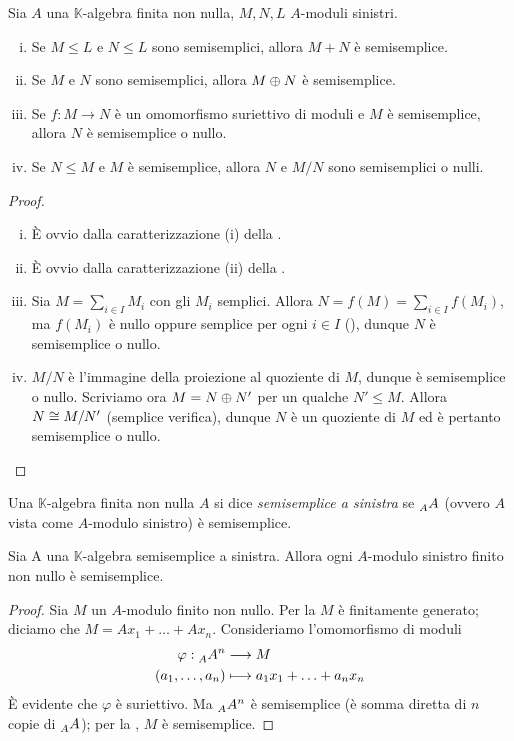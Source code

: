\begin{proposition}
Sia $A$ una $\mathbb{K}$-algebra finita non nulla, $M,N,L$ $A$-moduli sinistri.
\begin{enumerate}[(i)]
\item Se $M\le L$ e $N\le L$ sono semisemplici, allora $M+N$ è semisemplice.
\item Se $M$ e $N$ sono semisemplici, allora $M\oplus N$ è semisemplice.
\item Se $f:M\to N$ è un omomorfismo suriettivo di moduli e $M$ è semisemplice, allora $N$ è semisemplice o nullo.
\item Se $N\le M$ e $M$ è semisemplice, allora $N$ e $M/N$ sono semisemplici o nulli.
\end{enumerate}
\end{proposition}
\begin{proof}
\leavevmode
\begin{enumerate}[(i)]
\item È ovvio dalla caratterizzazione (i) della .
\item È ovvio dalla caratterizzazione (ii) della .
\item Sia $M=\sum_{i\in I}M_i$ con gli $M_i$ semplici. Allora $N=f(M)=\sum_{i\in I}f(M_i)$, ma $f(M_i)$ è nullo oppure semplice per ogni $i\in I$ (), dunque $N$ è semisemplice o nullo.
\item $M/N$ è l'immagine della proiezione al quoziente di $M$, dunque è semisemplice o nullo. Scriviamo ora $M=N\oplus N'$ per un qualche $N'\le M$. Allora $N\cong M/N'$ (semplice verifica), dunque $N$ è un quoziente di $M$ ed è pertanto semisemplice o nullo.
\end{enumerate}
\end{proof}


\begin{definition}
Una $\mathbb{K}$-algebra finita non nulla $A$ si dice \emph{semisemplice a sinistra} se $\prescript{}{A}{A}$ (ovvero $A$ vista come $A$-modulo sinistro) è semisemplice.
\end{definition}


\begin{proposition}
Sia A una $\mathbb{K}$-algebra semisemplice a sinistra. Allora ogni $A$-modulo sinistro finito non nullo è semisemplice.
\end{proposition}
\begin{proof}
Sia $M$ un $A$-modulo finito non nullo. Per la  $M$ è finitamente generato; diciamo che $M=Ax_1+\ldots+Ax_n$. Consideriamo l'omomorfismo di moduli
\begin{align*}
\varphi:\prescript{}{A}{A}^n&\longrightarrow M\\
(a_1,\ldots,a_n)&\longmapsto a_1x_1+\ldots+a_nx_n
\end{align*}
È evidente che $\varphi$ è suriettivo. Ma $\prescript{}{A}{A}^n$ è semisemplice (è somma diretta di $n$ copie di $\prescript{}{A}{A}$); per la , $M$ è semisemplice.
\end{proof}


